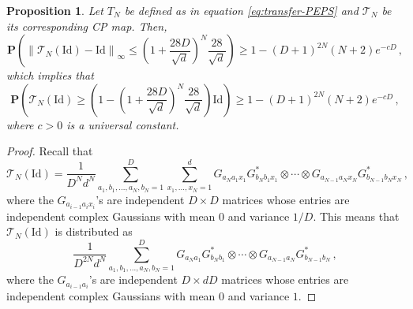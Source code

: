 \documentclass{amsart}
\newtheorem{proposition}[theorem]{Proposition}
\renewcommand{\P}{\mathbf{P}}
\renewcommand{\leq}{\leqslant}
\renewcommand{\geq}{\geqslant}
\newcommand{\Id}{\mathrm{Id}}
\begin{document}
\begin{proposition} \label{prop:PEPS-CP}
    Let $T_N$ be defined as in equation \eqref{eq:transfer-PEPS} and $\mathcal T_N$ be its corresponding CP map. Then,
    \[ \P\left( \left\| \mathcal T_N(\Id) - \Id \right\|_{\infty} \leq \left(1+\frac{28D}{\sqrt{d}}\right)^N\frac{28}{\sqrt{d}} \right) \geq 1-(D+1)^{2N} (N+2)e^{-cD} \, , \]
    which implies that
    \[ \P\left( \mathcal T_N(\Id) \geq \left(1- \left(1+\frac{28D}{\sqrt{d}}\right)^N\frac{28}{\sqrt{d}} \right) \Id \right) \geq 1- (D+1)^{2N} (N+2)e^{-cD} \, , \]
    where $c>0$ is a universal constant.
\end{proposition}

\begin{proof}
    Recall that
    \[ \mathcal T_N(\Id) = \frac{1}{D^Nd^N} \sum_{a_1,b_1,\ldots,a_N,b_N=1}^D \sum_{x_1,\ldots,x_N=1}^d G_{a_Na_1x_1}G^*_{b_Nb_1x_1}\otimes \cdots\otimes G_{a_{N-1}a_Nx_N}G^*_{b_{N-1}b_Nx_N} \, , \]
    where the $G_{a_{i-1}a_ix_i}$'s are independent $D\times D$ matrices whose entries are independent complex Gaussians with mean $0$ and variance $1/D$. This means that $\mathcal T_N(\Id)$ is distributed as
    \begin{equation} \label{eq:T_N(Id)}
        \frac{1}{D^{2N}d^N} \sum_{a_1,b_1,\ldots,a_N,b_N=1}^D G_{a_Na_1}G^*_{b_Nb_1}\otimes \cdots\otimes G_{a_{N-1}a_N}G^*_{b_{N-1}b_N} \, ,
    \end{equation}
    where the $G_{a_{i-1}a_i}$'s are independent $D\times dD$ matrices whose entries are independent complex Gaussians with mean $0$ and variance $1$.


\end{proof}
\end{document}
